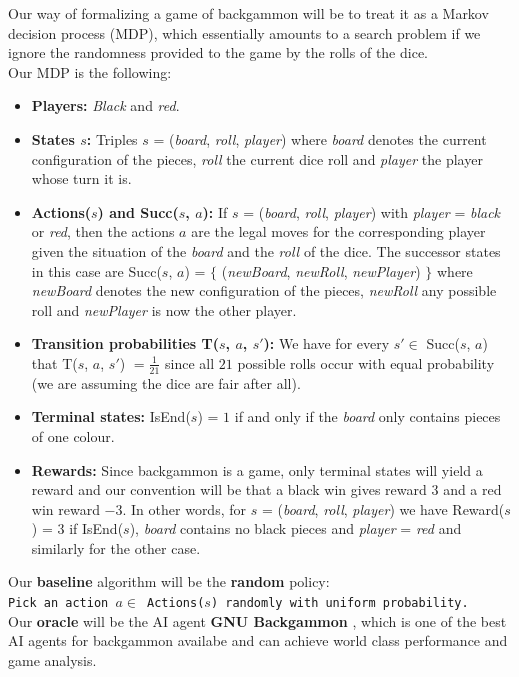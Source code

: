 \documentclass[11pt, a4paper, twoside]{amsart} %
\theoremstyle{definition}
\begin{document}
Our way of formalizing a game of backgammon will be to treat it as a Markov decision process (MDP), which essentially amounts to a search problem if we ignore the randomness provided to the game by the rolls of the dice.\\
Our MDP is the following:\\
\begin{itemize}
\item \textbf{Players:} \emph{Black} and \emph{red}.
\item \textbf{States $s$:} Triples $s$ = (\emph{board}, \emph{roll}, \emph{player}) where \emph{board} denotes the current configuration of the pieces, \emph{roll} the current dice roll and \emph{player} the player whose turn it is.
\item \textbf{Actions($s$) and Succ($s$, $a$):} If $s$ = (\emph{board}, \emph{roll}, \emph{player}) with \emph{player} = \emph{black} or \emph{red}, then the actions $a$ are the legal moves for the corresponding player given the situation of the \emph{board} and the \emph{roll} of the dice. The successor states in this case are Succ($s$, $a$) = $\lbrace$ (\emph{newBoard}, \emph{newRoll}, \emph{newPlayer}) $\rbrace$ where \emph{newBoard} denotes the new configuration of the pieces, \emph{newRoll} any possible roll and \emph{newPlayer} is now the other player.
\item \textbf{Transition probabilities T($s$, $a$, $s'$):} We have for every $s' \in$ Succ($s$, $a$) that T($s$, $a$, $s'$) $= \frac{1}{21}$ since all $21$ possible rolls occur with equal probability (we are assuming the dice are fair after all).
\item \textbf{Terminal states:} IsEnd($s$) = $1$ if and only if the \emph{board} only contains pieces of one colour.
\item \textbf{Rewards:} Since backgammon is a game, only terminal states will yield a reward and our convention will be that a black win gives reward $3$ and a red win reward $-3$. In other words, for $s$ = (\emph{board}, \emph{roll}, \emph{player}) we have Reward($s$) = $3$ if IsEnd($s$), \emph{board} contains no black pieces and \emph{player} = \emph{red} and similarly for the other case.\\
\end{itemize}

Our \textbf{baseline} algorithm will be the \textbf{random} policy:\\
\texttt{Pick an action $a \in $ Actions($s$) randomly with uniform probability.\\}
Our \textbf{oracle} will be the AI agent \textbf{GNU Backgammon} \citep{GnuBG}, which is one of the best AI agents for backgammon availabe and can achieve world class performance and game analysis.
\end{document}
